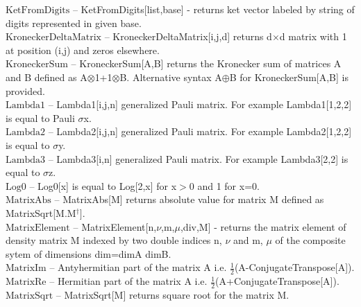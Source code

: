 \documentclass[a4paper,10pt]{scrartcl}
\begin{document}
\textbf{$ \text{KetFromDigits} $ }-- KetFromDigits[list,base] - returns ket vector labeled by string of digits represented in given base.$  $\\

\textbf{$ \text{KroneckerDeltaMatrix} $ }-- KroneckerDeltaMatrix[i,j,d] returns d$\times $d matrix with 1 at position (i,j) and zeros elsewhere.$  $\\

\textbf{$ \text{KroneckerSum} $ }-- KroneckerSum[A,B] returns the Kronecker sum of matrices A and B defined as A$\otimes $1+1$\otimes $B. Alternative syntax A$\oplus $B for KroneckerSum[A,B] is provided.$  $\\

\textbf{$ \text{Lambda1} $ }-- Lambda1[i,j,n] generalized Pauli matrix. For example Lambda1[1,2,2] is equal to Pauli $\sigma $x.$  $\\

\textbf{$ \text{Lambda2} $ }-- Lambda2[i,j,n] generalized Pauli matrix. For example Lambda2[1,2,2] is equal to $\sigma $y.$  $\\

\textbf{$ \text{Lambda3} $ }-- Lambda3[i,n] generalized Pauli matrix. For example Lambda3[2,2] is equal to $\sigma $z.$  $\\

\textbf{$ \text{Log0} $ }-- Log0[x] is equal to Log[2,x] for x$>$0 and 1 for x=0.$  $\\

\textbf{$ \text{MatrixAbs} $ }-- MatrixAbs[M] returns absolute value for matrix M defined as MatrixSqrt[M.M$  ^{\dagger }\text{].} $\\

\textbf{$ \text{MatrixElement} $ }-- MatrixElement[n,$\nu $,m,$\mu $,div,M] - returns the matrix element of density matrix M indexed by two double indices n, $\nu $ and m, $\mu $ of the composite sytem of dimensions dim=dimA dimB.$  $\\

\textbf{$ \text{MatrixIm} $ }-- Antyhermitian part of the matrix A i.e. $ \frac{1}{2} $(A-ConjugateTranspose[A]).$  $\\

\textbf{$ \text{MatrixRe} $ }-- Hermitian part of the matrix A i.e. $ \frac{1}{2} $(A+ConjugateTranspose[A]).$  $\\

\textbf{$ \text{MatrixSqrt} $ }-- MatrixSqrt[M] returns square root for the matrix M.$  $\\
\end{document}
